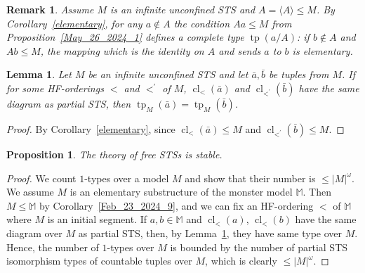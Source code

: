 \documentclass[a4paper, 11pt]{article}
\DeclareMathOperator{\cl}{cl}
\DeclareMathOperator{\tp}{tp}
\newcommand{\mons}{\mathbb{M}}
\theoremstyle{note}
\newtheorem{lemma}[thm]{Lemma}
\newtheorem{rmk}[thm]{Remark}
\newtheorem{prop}[thm]{Proposition}
\begin{document}
	
	
	\begin{rmk} Assume $M$ is an infinite unconfined STS and  $A=\langle A\rangle \leq M$. By Corollary~\ref{elementary}, for any $a\not\in A$ the condition $Aa\leq M$ from Proposition~\ref{May_26_2024_1}
		defines a complete type $\tp(a/A)$: if $b\not\in A$ and $Ab\leq M$, the mapping which is the identity on $A$ and sends $a$ to $b$ is elementary. 
		\end{rmk}
	
	
	\begin{lemma}\label{elementary2}
		Let $M$ be an infinite unconfined STS and let $\bar{a},\bar{b}$ be tuples from $M$. If for some HF-orderings $<$ and $<^\prime$  of $M$,  $\cl_<(\bar{a})$ and $\cl_{<^\prime}(\bar{b})$ have the same diagram as partial STS, then  $\tp_M(\bar{a})=\tp_M(\bar{b})$.
	\end{lemma}
	\begin{proof} By Corollary~\ref{elementary}, since $\cl_<(\bar{a})\leq M$ and  $\cl_{<^\prime}(\bar{b})\leq M$.
		\end{proof}
		
		
	
	
	
	\begin{prop}\label{stable} The theory of free STSs  is stable.
	\end{prop}
	\begin{proof}  We count  $1$-types over a model $M$ and show that their number is $\leq |M|^\omega$. We assume $M$ is an elementary substructure of the monster model $\mons$. Then  $M\leq \mons$ by  Corollary~\ref{Feb_23_2024_9}, and we can fix an HF-ordering $<$ of $\mons$ where $M$ is an initial segment. If $a,b \in \mons$ and $\cl_<(a)$, $\cl_<(b)$ have the same diagram over $M$ as partial STS, then, by Lemma~\ref{elementary2}, they have same type over $M$.
	Hence, the number of $1$-types over $M$ is bounded by the number of partial STS isomorphism types of countable tuples over $M$, which is clearly $\leq |M|^\omega$.
	\end{proof}
	
\end{document}
